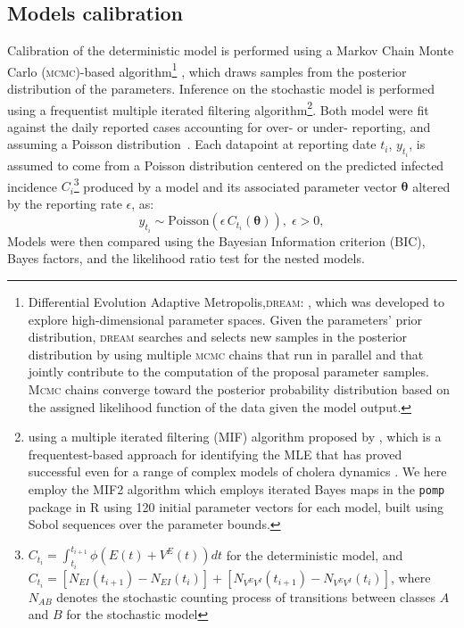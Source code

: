 \subsection{Models calibration}
Calibration of the deterministic model is performed using a Markov Chain Monte Carlo (\textsc{mcmc})-based algorithm\footnote[][-5\baselineskip]{Differential Evolution Adaptive Metropolis,\textsc{dream}: \parencite{Vrugt:MarkovChainMonte:2016}, which was developed to explore high-dimensional parameter spaces. Given the parameters' prior distribution, \textsc{dream} searches and selects new samples in the posterior distribution by using multiple \textsc{mcmc} chains that run in parallel and that jointly contribute to the computation of the proposal parameter samples. \textsc{Mcmc} chains  converge toward the posterior probability distribution based on the assigned likelihood function of the data given the model output.} , which draws samples from the posterior distribution of the parameters.
Inference on the stochastic model is performed using a frequentist multiple iterated filtering algorithm\footnote{using a multiple iterated filtering (MIF) algorithm proposed by \parencite{Ionides:InferenceDynamicLatent:2015}, which is a frequentest-based approach for identifying the MLE that has proved successful even for a range of complex models of cholera dynamics \parencite{King:InapparentInfectionsCholera:2008,Baracchini:SeasonalityCholeraDynamics:2017}. We here employ the MIF2 algorithm which employs iterated Bayes maps in the \texttt{pomp} package in R \parencite{King:StatisticalInferencePartially:2015} using 120 initial parameter vectors for each model, built using Sobol sequences over the parameter bounds.}. Both model were fit against the daily reported cases accounting for over- or under- reporting, and assuming a Poisson distribution~\cite{Camacho:CholeraEpidemicYemen:2018}. Each datapoint at reporting date $t_i$,  $y_{t_i}$, is assumed to come from a Poisson distribution centered on the predicted infected incidence $C_i$\footnote{$ C_{t_i} = \int_{t_i}^{t_{i+1}} \phi \left(E(t) + V^E(t)\right) dt  $ for the deterministic model, and $ C_{t_i} = [N_{EI}(t_{i+1}) - N_{EI}(t_i)] + [N_{V^EV^I}(t_{i+1}) - N_{V^EV^I}(t_i)] $, where $N_{AB}$ denotes the stochastic counting process of transitions between classes $A$ and $B$ for the stochastic model} produced by a model and its associated parameter vector $\boldsymbol{\theta}$ altered by the reporting rate $\epsilon$, as:
\begin{equation}
 y_{t_i}  \sim \text{Poisson}\left(\epsilon \,C_{t_i}(\boldsymbol{\theta})\right), \; \epsilon > 0,
 \label{eq:obs}
\end{equation}
 Models were then compared using the Bayesian Information criterion (BIC), Bayes factors, and the likelihood ratio test for the nested models.
 

